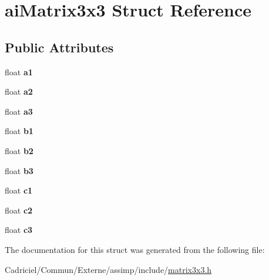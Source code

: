 \hypertarget{structai_matrix3x3}{}\section{ai\+Matrix3x3 Struct Reference}
\label{structai_matrix3x3}
\subsection*{Public Attributes}
\begin{DoxyCompactItemize}
\item 
float {\bfseries a1}\hypertarget{structai_matrix3x3_a6884258a2f50758ed8b554b531186917}{}\label{structai_matrix3x3_a6884258a2f50758ed8b554b531186917}

\item 
float {\bfseries a2}\hypertarget{structai_matrix3x3_a4c74733870193040ba4953fb673e77df}{}\label{structai_matrix3x3_a4c74733870193040ba4953fb673e77df}

\item 
float {\bfseries a3}\hypertarget{structai_matrix3x3_a851d391df32a39e1ced1a9a286b38cf4}{}\label{structai_matrix3x3_a851d391df32a39e1ced1a9a286b38cf4}

\item 
float {\bfseries b1}\hypertarget{structai_matrix3x3_a9eeba340d3502017caad70416f03863a}{}\label{structai_matrix3x3_a9eeba340d3502017caad70416f03863a}

\item 
float {\bfseries b2}\hypertarget{structai_matrix3x3_a9f5e25b60bbd7bdf8f0a19cd82cc6b15}{}\label{structai_matrix3x3_a9f5e25b60bbd7bdf8f0a19cd82cc6b15}

\item 
float {\bfseries b3}\hypertarget{structai_matrix3x3_a21aa4345fe6ce2774db94d118c536d02}{}\label{structai_matrix3x3_a21aa4345fe6ce2774db94d118c536d02}

\item 
float {\bfseries c1}\hypertarget{structai_matrix3x3_ae62a2877076cbee151e89cb34567e3ca}{}\label{structai_matrix3x3_ae62a2877076cbee151e89cb34567e3ca}

\item 
float {\bfseries c2}\hypertarget{structai_matrix3x3_a8e0d85d5c46eb4f4478f1fe159be4320}{}\label{structai_matrix3x3_a8e0d85d5c46eb4f4478f1fe159be4320}

\item 
float {\bfseries c3}\hypertarget{structai_matrix3x3_aa7eef894dec22db1011092410b24f19b}{}\label{structai_matrix3x3_aa7eef894dec22db1011092410b24f19b}

\end{DoxyCompactItemize}


The documentation for this struct was generated from the following file\+:\begin{DoxyCompactItemize}
\item 
Cadriciel/\+Commun/\+Externe/assimp/include/\hyperlink{matrix3x3_8h}{matrix3x3.\+h}\end{DoxyCompactItemize}
